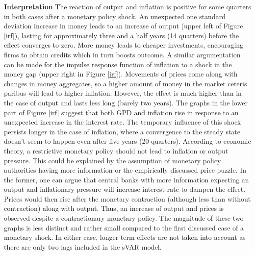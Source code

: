 \documentclass[11pt,a4paper]{report}
\begin{document}
\noindent \textbf{Interpretation}
\newline
The reaction of output and inflation is positive for some quarters in both cases after a monetary policy shock. An unexpected one standard deviation increase in money leads to an increase of output (upper left of Figure \ref{irf}), lasting for approximately three and a half years (14 quarters) before the effect converges to zero. More money leads to cheaper investments, encouraging firms to obtain credits which in turn boosts outcome. A similar argumentation can be made for the impulse response function of inflation to a shock in the money gap (upper right in Figure \ref{irf}).  Movements of prices come along with changes in money aggregates, so a higher amount of money in the market ceteris paribus will lead to higher inflation. However, the effect is much higher than in the case of output and lasts less long (barely two years). The graphs in the lower part of Figure \ref{irf} suggest that both GPD and inflation rise in response to an unexpected increase in the interest rate. The temporary influence of this shock persists longer in the case of inflation, where a convergence to the steady state doesn't seem to happen even after five years (20 quarters). According to economic theory,  a  restrictive  monetary  policy  should  not  lead  to  inflation  or  output  pressure. This could be explained by the assumption of monetary policy authorities having more information or the empirically discussed price puzzle. In the former, one can argue that central banks with more information expecting an output and inflationary pressure will increase interest rate to dampen the effect. Prices would then rise after the monetary contraction (although less than without contraction) along with output. Thus, an increase of output and prices is observed despite a contractionary monetary policy. The magnitude of these two graphs is less distinct and rather small compared to the first discussed case of a monetary shock. In either case, longer term effects are not taken into account as there are only two lags included in the sVAR model.
\end{document}
